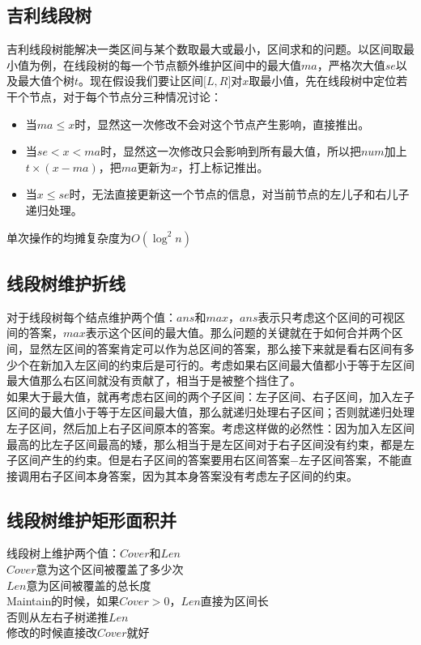     \subsection*{吉利线段树}
        吉利线段树能解决一类区间与某个数取最大或最小，区间求和的问题。以区间取最小值为例，在线段树的每一个节点额外维护区间中的最大值$ ma $，严格次大值$ se $以及最大值个树$ t $。现在假设我们要让区间$ \lbrack L, R \rbrack $对$ x $取最小值，先在线段树中定位若干个节点，对于每个节点分三种情况讨论：
        \begin{itemize}[wide=0pt]
            \item 当$ ma \leq x $时，显然这一次修改不会对这个节点产生影响，直接推出。
            \item 当$ se < x < ma $时，显然这一次修改只会影响到所有最大值，所以把$ num $加上$ t \times (x - ma) $，把$ ma $更新为$ x $，打上标记推出。
            \item 当$ x \leq se $时，无法直接更新这一个节点的信息，对当前节点的左儿子和右儿子递归处理。
        \end{itemize}
        单次操作的均摊复杂度为$ O(\log^2 n) $
    \subsection*{线段树维护折线}
        对于线段树每个结点维护两个值：$ ans $和$ max $，$ ans $表示只考虑这个区间的可视区间的答案，$ max $表示这个区间的最大值。那么问题的关键就在于如何合并两个区间，显然左区间的答案肯定可以作为总区间的答案，那么接下来就是看右区间有多少个在新加入左区间的约束后是可行的。考虑如果右区间最大值都小于等于左区间最大值那么右区间就没有贡献了，相当于是被整个挡住了。
        \\如果大于最大值，就再考虑右区间的两个子区间：左子区间、右子区间，加入左子区间的最大值小于等于左区间最大值，那么就递归处理右子区间；否则就递归处理左子区间，然后加上右子区间原本的答案。考虑这样做的必然性：因为加入左区间最高的比左子区间最高的矮，那么相当于是左区间对于右子区间没有约束，都是左子区间产生的约束。但是右子区间的答案要用右区间答案$ - $左子区间答案，不能直接调用右子区间本身答案，因为其本身答案没有考虑左子区间的约束。
    \subsection*{线段树维护矩形面积并}
        \noindent 线段树上维护两个值：$ Cover $和$ Len $
        \\$ Cover $意为这个区间被覆盖了多少次
        \\$ Len $意为区间被覆盖的总长度
        \\Maintain的时候，如果$ Cover > 0 $，$ Len $直接为区间长
        \\否则从左右子树递推$ Len $
        \\修改的时候直接改$ Cover $就好

